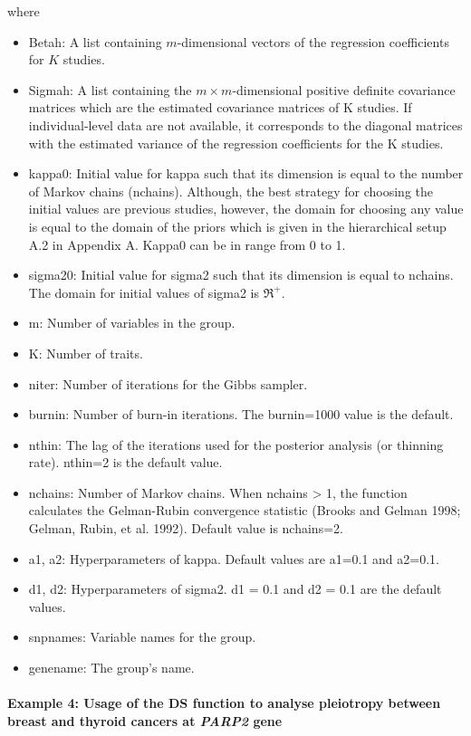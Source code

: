 where

\begin{itemize}
\tightlist
\item
  Betah: A list containing \(m\)-dimensional vectors of the regression coefficients for \(K\) studies.
\item
  Sigmah: A list containing the \(m \times m\)-dimensional positive definite covariance matrices which are the estimated covariance matrices of K studies. If individual-level data are not available, it corresponds to the diagonal matrices with the estimated variance of the regression coefficients for the K studies.
\item
  kappa0: Initial value for kappa such that its dimension is equal to the number of Markov chains (nchains).
  Although, the best strategy for choosing the initial values are previous studies, however, the domain for choosing any value is equal to the domain of the priors which is given in the hierarchical setup A.2 in Appendix A.
  Kappa0 can be in range from 0 to 1.
\item
  sigma20: Initial value for sigma2 such that its dimension is equal to nchains. The domain for initial values of sigma2 is \(\Re^+\).
\item
  m: Number of variables in the group.
\item
  K: Number of traits.
\item
  niter: Number of iterations for the Gibbs sampler.
\item
  burnin: Number of burn-in iterations. The burnin=1000 value is the default.
\item
  nthin: The lag of the iterations used for the posterior analysis (or thinning rate). nthin=2 is the default value.
\item
  nchains: Number of Markov chains. When nchains \textgreater{} 1, the function calculates the Gelman-Rubin convergence statistic (Brooks and Gelman 1998; Gelman, Rubin, et al. 1992). Default value is nchains=2.
\item
  a1, a2: Hyperparameters of kappa. Default values are a1=0.1 and a2=0.1.
\item
  d1, d2: Hyperparameters of sigma2. d1 = 0.1 and d2 = 0.1 are the default values.
\item
  snpnames: Variable names for the group.
\item
  genename: The group's name.
\end{itemize}

\hypertarget{example-4-usage-of-the-ds-function-to-analyse-pleiotropy-between-breast-and-thyroid-cancers-at-parp2-gene}{%
\paragraph{\texorpdfstring{Example 4: Usage of the DS function to analyse pleiotropy between breast and thyroid cancers at \emph{PARP2} gene}{Example 4: Usage of the DS function to analyse pleiotropy between breast and thyroid cancers at PARP2 gene}}\label{example-4-usage-of-the-ds-function-to-analyse-pleiotropy-between-breast-and-thyroid-cancers-at-parp2-gene}}

